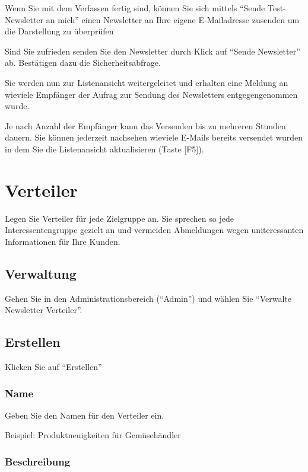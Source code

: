 \documentclass[article, a4paper, oneside, 11pt]{memoir}
\begin{document}
Wenn Sie mit dem Verfassen fertig sind, können Sie sich mittels "`Sende Test-Newsletter an mich"' einen Newsletter an Ihre eigene E-Mailadresse zusenden um die Darstellung zu überprüfen

Sind Sie zufrieden senden Sie den Newsletter durch Klick auf "`Sende Newsletter"' ab. Bestätigen dazu die Sicherheitsabfrage.

Sie werden nun zur Listenansicht weitergeleitet und erhalten eine Meldung an wieviele Empfänger der Aufrag zur Sendung des Newsletters entgegengenommen wurde.

Je nach Anzahl der Empfänger kann das Versenden bis zu mehreren Stunden dauern. Sie können jederzeit nachsehen wieviele E-Mails bereits versendet wurden in dem Sie die Listenansicht aktualisieren (Taste [F5]).



\chapter{Verteiler}
\label{sec:verteiler}

Legen Sie Verteiler für jede Zielgruppe an. Sie sprechen so jede Interessentengruppe gezielt an und vermeiden Abmeldungen wegen uniteressanten Informationen für Ihre Kunden.

\section{Verwaltung}

Gehen Sie in den Administrationsbereich ("`Admin"') und wählen Sie "`Verwalte Newsletter Verteiler"'.

\section{Erstellen}
\label{sec:create-mailing-list}

Klicken Sie auf "`Erstellen"'

\subsection{Name}

Geben Sie den Namen für den Verteiler ein.

Beispiel: Produktneuigkeiten für Gemüsehändler

\subsection{Beschreibung}
\end{document}
